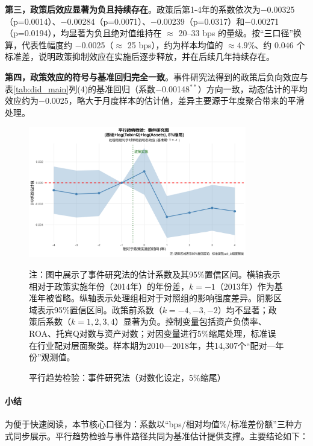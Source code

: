 \textbf{第三，政策后效应显著为负且持续存在}。政策后第1-4年的系数依次为$-$0.00325（p=0.0014）、$-$0.00284（p=0.0071）、$-$0.00239（p=0.0317）和$-$0.00271（p=0.0194），均显著为负且绝对值维持在 $\approx$ 20–33 bps 的量级。按“三口径”换算，代表性幅度约 $-$0.0025（$\approx$ 25 bps），约为样本均值的 $\approx4.9\%$、约 $0.046$ 个标准差，说明政策抑制效应在实施后逐步释放，并在后续几年持续存在。

\textbf{第四，政策效应的符号与基准回归完全一致}。事件研究法得到的政策后负向效应与表\ref{tab:did_main}列(4)的基准回归（系数$-$0.00148$^{**}$）方向一致，动态估计的平均效应约为$-$0.0025，略大于月度样本的估计值，差异主要源于年度聚合带来的平滑处理。

\begin{figure}[htbp]
\centering
\includegraphics[width=0.85\textwidth]{figures/PT_logQA_0pct5.png}
\caption{平行趋势检验：事件研究法（对数化设定，5\%缩尾）}
\label{fig:parallel_trends}
\begin{minipage}{0.9\textwidth}
\footnotesize
注：图中展示了事件研究法的估计系数及其95\%置信区间。横轴表示相对于政策实施年份（2014年）的年份差，$k=-1$（2013年）作为基准年被省略。纵轴表示处理组相对于对照组的影响强度差异。阴影区域表示95\%置信区间。政策前系数（$k=-4,-3,-2$）均不显著；政策后系数（$k=1,2,3,4$）显著为负。控制变量包括资产负债率、ROA、托宾Q对数与资产对数；对因变量进行5\%缩尾处理，标准误在行业配对层面聚类。样本期为2010—2018年，共14,307个“配对—年份”观测值。
\end{minipage}
\end{figure}

\paragraph{小结}

为便于快速阅读，本节核心口径为：系数以“bps/相对均值\%/标准差份额”三种方式同步展示。平行趋势检验与事件路径共同为基准估计提供支撑。主要结论如下：

